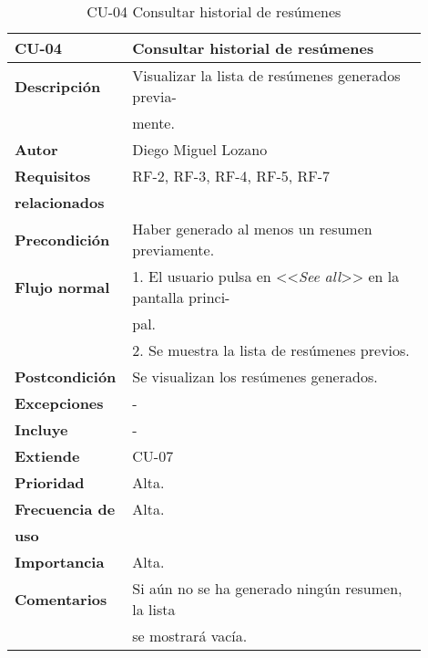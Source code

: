\begin{longtable}{>{\raggedright}b{0.2\linewidth}>{\raggedright\arraybackslash}b{0.7\linewidth}}
	\toprule
	\textbf{CU-04} & \textbf{Consultar historial de resúmenes} \\
	\toprule
	\endhead
	
	\toprule
	\caption{CU-04 Consultar historial de resúmenes}
	\endfoot
	
	\small{\textbf{Descripción}} & Visualizar la lista de resúmenes generados previa- \\
	& mente. \\
	\small{\textbf{Autor}} & Diego Miguel Lozano \\
	\small{\textbf{Requisitos}} & RF-2, RF-3, RF-4, RF-5, RF-7  \\
	\small{\textbf{relacionados}} & \\
	\small{\textbf{Precondición}} & Haber generado al menos un resumen previamente. \\
	\small{\textbf{Flujo normal}} & \quad \small{1. El usuario pulsa en <<\emph{See all}>> en la pantalla princi-} \\
	& \qquad \small{pal.} \\
	& \quad \small{2. Se muestra la lista de resúmenes previos.} \\
	\small{\textbf{Postcondición}} & Se visualizan los resúmenes generados. \\
	\small{\textbf{Excepciones}} & - \\
	\small{\textbf{Incluye}} & - \\
	\small{\textbf{Extiende}} & CU-07 \\
	\small{\textbf{Prioridad}} & Alta. \\
	\small{\textbf{Frecuencia de}} & Alta. \\
	\small{\textbf{uso}} & \\
	\small{\textbf{Importancia}} & Alta. \\
	\small{\textbf{Comentarios}} & Si aún no se ha generado ningún resumen, la lista\\
	& se mostrará vacía. \\
\end{longtable}


